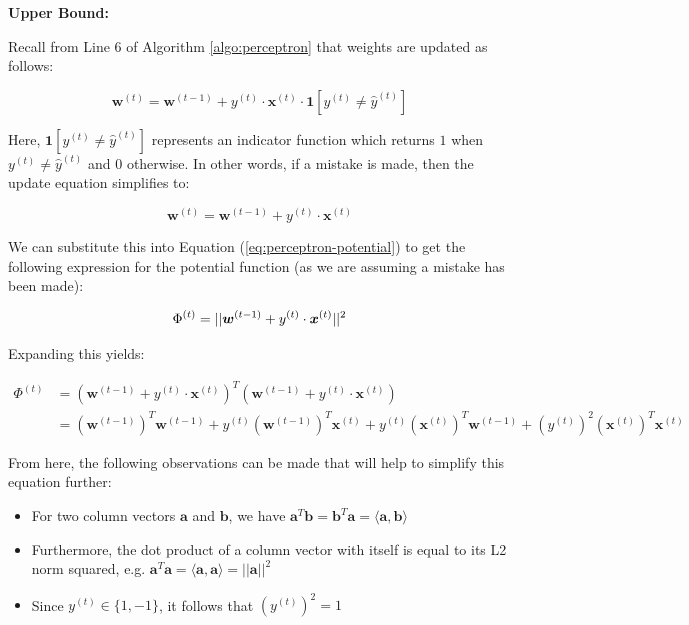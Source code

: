 \documentclass[11pt]{article}
\begin{document}
\textbf{Upper Bound:}

Recall from Line 6 of Algorithm \ref{algo:perceptron} that weights are updated as follows:

$$\boldsymbol{w}^{(t)} = \boldsymbol{w}^{(t-1)} + y^{(t)} \cdot \boldsymbol{x}^{(t)} \cdot \boldsymbol{1}[y^{(t)}\neq\hat{y}^{(t)}]$$

Here, $\boldsymbol{1}[y^{(t)}\neq\hat{y}^{(t)}]$ represents an indicator function which returns $1$ when $y^{(t)}\neq\hat{y}^{(t)}$ and $0$ otherwise. In other words, if a mistake is made, then the update equation simplifies to:

\begin{equation}
\boldsymbol{w}^{(t)} = \boldsymbol{w}^{(t-1)} + y^{(t)} \cdot \boldsymbol{x}^{(t)}
\label{eq:weight-update}
\end{equation}

We can substitute this into Equation (\ref{eq:perceptron-potential}) to get the following expression for the potential function (as we are assuming a mistake has been made):

$$\Phi^{(t)} = ||\boldsymbol{w}^{(t-1)} + y^{(t)} \cdot \boldsymbol{x}^{(t)}||^2 \\
$$

Expanding this yields:

\begin{align}
\Phi^{(t)} &= \left(\boldsymbol{w}^{(t-1)} + y^{(t)} \cdot \boldsymbol{x}^{(t)}\right)^T\left(\boldsymbol{w}^{(t-1)} + y^{(t)} \cdot \boldsymbol{x}^{(t)}\right) \\
&= {(\boldsymbol{w}^{(t-1)})}^T\boldsymbol{w}^{(t-1)} + y^{(t)}{(\boldsymbol{w}^{(t-1)})}^T\boldsymbol{x}^{(t)} + y^{(t)}{(\boldsymbol{x}^{(t)})}^T\boldsymbol{w}^{(t-1)} + {(y^{(t)})}^2{(\boldsymbol{x}^{(t)})}^T\boldsymbol{x}^{(t)}
\label{eq:expanded-potential}
\end{align}

From here, the following observations can be made that will help to simplify this equation further:

\begin{itemize}
    \item For two column vectors $\boldsymbol{a}$ and $\boldsymbol{b}$, we have $\boldsymbol{a}^T\boldsymbol{b} = \boldsymbol{b}^T\boldsymbol{a} = \langle\boldsymbol{a},\boldsymbol{b}\rangle$
    \item Furthermore, the dot product of a column vector with itself is equal to its L2 norm squared, e.g. $\boldsymbol{a}^T\boldsymbol{a} = \langle\boldsymbol{a},\boldsymbol{a}\rangle = ||\boldsymbol{a}||^2$
    \item Since $y^{(t)}\in \{1,-1\}$, it follows that ${(y^{(t)})}^2 = 1$
\end{itemize}
\end{document}
